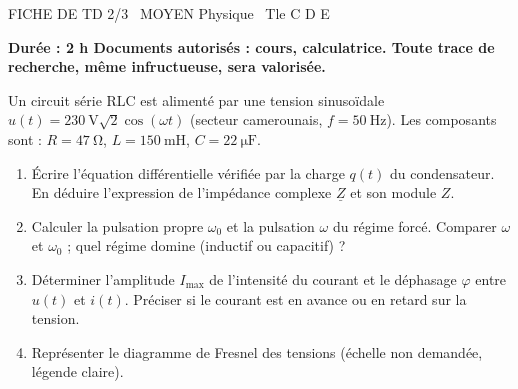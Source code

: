 \documentclass[11pt]{article}
\begin{document}
\begin{tcolorbox}[enhanced,colback=popink,colframe=popink,arc=10pt,boxrule=0pt,left=12pt,right=12pt,top=9pt,bottom=9pt]
{\color{white}\popxbold\small FICHE DE TD 2/3 \textbullet\ MOYEN \hfill Physique \textbullet\ Tle C D E\par}
\end{tcolorbox}
\vspace{4pt}
\textbf{Durée : 2 h \quad Documents autorisés : cours, calculatrice. \quad Toute trace de recherche, même infructueuse, sera valorisée.}

\begin{exercice}
Un circuit série RLC est alimenté par une tension sinusoïdale $u(t)=\SI{230}{\volt}\sqrt{2}\cos(\omega t)$ (secteur camerounais, $f=\SI{50}{\hertz}$). Les composants sont : $R=\SI{47}{\ohm}$, $L=\SI{150}{\milli\henry}$, $C=\SI{22}{\micro\farad}$.
\begin{enumerate}
    \item Écrire l'équation différentielle vérifiée par la charge $q(t)$ du condensateur. En déduire l'expression de l'impédance complexe $\underline{Z}$ et son module $Z$.
    \item Calculer la pulsation propre $\omega_0$ et la pulsation $\omega$ du régime forcé. Comparer $\omega$ et $\omega_0$ ; quel régime domine (inductif ou capacitif) ?
    \item Déterminer l'amplitude $I_{\text{max}}$ de l'intensité du courant et le déphasage $\varphi$ entre $u(t)$ et $i(t)$. Préciser si le courant est en avance ou en retard sur la tension.
    \item Représenter le diagramme de Fresnel des tensions (échelle non demandée, légende claire).
\end{enumerate}
\end{exercice}
\end{document}
